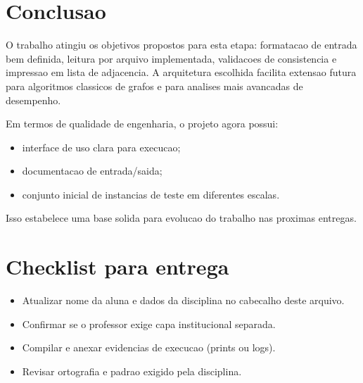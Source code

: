 \documentclass[12pt,a4paper]{article}
\begin{document}
\section{Conclusao}
O trabalho atingiu os objetivos propostos para esta etapa: formatacao de entrada bem definida, leitura por arquivo implementada, validacoes de consistencia e impressao em lista de adjacencia. A arquitetura escolhida facilita extensao futura para algoritmos classicos de grafos e para analises mais avancadas de desempenho.

Em termos de qualidade de engenharia, o projeto agora possui:
\begin{itemize}
    \item interface de uso clara para execucao;
    \item documentacao de entrada/saida;
    \item conjunto inicial de instancias de teste em diferentes escalas.
\end{itemize}

Isso estabelece uma base solida para evolucao do trabalho nas proximas entregas.

\section*{Checklist para entrega}
\begin{itemize}
    \item Atualizar nome da aluna e dados da disciplina no cabecalho deste arquivo.
    \item Confirmar se o professor exige capa institucional separada.
    \item Compilar e anexar evidencias de execucao (prints ou logs).
    \item Revisar ortografia e padrao exigido pela disciplina.
\end{itemize}
\end{document}

